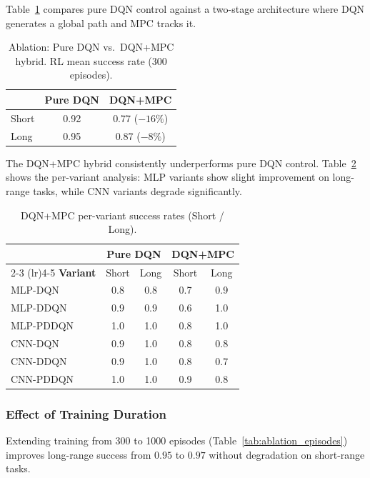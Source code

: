 \documentclass[conference]{IEEEtran}
\begin{document}
Table~\ref{tab:ablation_mpc} compares pure DQN control against a two-stage architecture where DQN generates a global path and MPC tracks it.

\begin{table}[t]
\centering
\caption{Ablation: Pure DQN vs.\ DQN+MPC hybrid. RL mean success rate (300 episodes).}
\label{tab:ablation_mpc}
\footnotesize
\begin{tabular}{@{}lcc@{}}
\toprule
& \textbf{Pure DQN} & \textbf{DQN+MPC} \\
\midrule
Short & 0.92 & 0.77 ($-16\%$) \\
Long  & 0.95 & 0.87 ($-8\%$) \\
\bottomrule
\end{tabular}
\end{table}

The DQN+MPC hybrid consistently underperforms pure DQN control.
Table~\ref{tab:ablation_mpc_detail} shows the per-variant analysis: MLP variants show slight improvement on long-range tasks, while CNN variants degrade significantly.

\begin{table}[t]
\centering
\caption{DQN+MPC per-variant success rates (Short / Long).}
\label{tab:ablation_mpc_detail}
\footnotesize
\begin{tabular}{@{}l cc cc@{}}
\toprule
& \multicolumn{2}{c}{\textbf{Pure DQN}} & \multicolumn{2}{c}{\textbf{DQN+MPC}} \\
\cmidrule(lr){2-3} \cmidrule(lr){4-5}
\textbf{Variant} & Short & Long & Short & Long \\
\midrule
MLP-DQN    & 0.8 & 0.8 & 0.7 & 0.9 \\
MLP-DDQN   & 0.9 & 0.9 & 0.6 & 1.0 \\
MLP-PDDQN  & 1.0 & 1.0 & 0.8 & 1.0 \\
CNN-DQN    & 0.9 & 1.0 & 0.8 & 0.8 \\
CNN-DDQN   & 0.9 & 1.0 & 0.8 & 0.7 \\
CNN-PDDQN  & 1.0 & 1.0 & 0.9 & 0.8 \\
\bottomrule
\end{tabular}
\end{table}

\subsubsection{Effect of Training Duration}

Extending training from 300 to 1000 episodes (Table~\ref{tab:ablation_episodes}) improves long-range success from $0.95$ to $0.97$ without degradation on short-range tasks.
\end{document}
